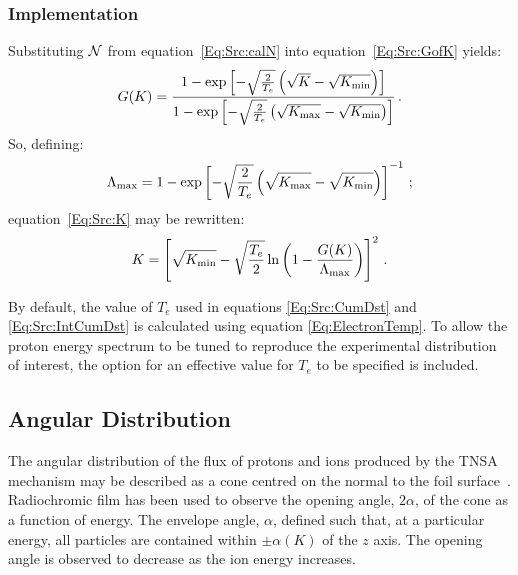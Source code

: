 \subsubsection{Implementation}
Substituting ${\cal N}$ from equation~\ref{Eq:Src:calN} into
equation~\ref{Eq:Src:GofK} yields:
\begin{equation}
  G(K) =
  \frac{1-\exp\left[-\sqrt{\frac{2}{T_e}}\left(\sqrt{K}-\sqrt{K_{\rm min}}\right)\right]}
       {1-\exp\left[-\sqrt{\frac{2}{T_e}}\left(\sqrt{K_{\rm max}}-\sqrt{K_{\rm min}}\right)\right]}\,.
  \label{Eq:Src:CumDst}
\end{equation}
So, defining:
\begin{equation}
  \Lambda_{\rm max} =
       1-\exp\left[-\sqrt{\frac{2}{T_e}}\left(\sqrt{K_{\rm max}}-\sqrt{K_{\rm min}}\right)\right]^{-1}\,;
  \label{Eq:Src:IntCumDst}
\end{equation}
equation~\ref{Eq:Src:K} may be rewritten:
\begin{equation}
  K = \left[ \sqrt{K_{\rm min}} - \sqrt{\frac{T_e}{2}}
             \ln \left( 1 - \frac{G(K)}{\Lambda_{\rm max}} \right)
      \right]^2 \, .
\end{equation}

By default, the value of $T_e$ used in equations \ref{Eq:Src:CumDst}
and \ref{Eq:Src:IntCumDst} is calculated using equation
\ref{Eq:ElectronTemp}. 
To allow the proton energy spectrum to be tuned to reproduce the
experimental distribution of interest, the option for an effective
value for $T_e$ to be specified is included.

\subsection{Angular Distribution}

The angular distribution of the flux of protons and ions produced by
the TNSA mechanism may be described as a cone centred on the normal to
the foil surface~\cite{10.1063/1.3086424}.
Radiochromic film has been used to observe the opening angle,
$2\alpha$, of the cone as a function of energy.
The envelope angle, $\alpha$, defined such that, at a particular
energy, all particles are contained within $\pm\alpha(K)$ of
the $z$ axis.
The opening angle is observed to decrease as the ion energy
increases.

